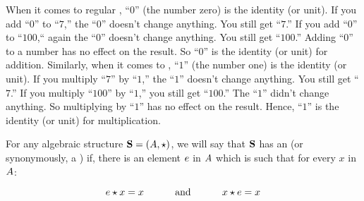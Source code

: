 \documentclass[../../../main.tex]{subfiles}
\begin{document}
\begin{aside}
  \begin{remark}
    When it comes to regular , ``$0$'' (the number zero) is the identity (or unit). If you add ``$0$'' to ``$7$,'' the ``$0$'' doesn't change anything. You still get ``$7$.'' If you add ``$0$'' to ``$100$,`` again the ``$0$'' doesn't change anything. You still get ``$100$.'' Adding ``$0$'' to a number has no effect on the result. So ``$0$'' is the identity (or unit) for addition.
    \vskip 0.5cm
    Similarly, when it comes to , ``$1$'' (the number one) is the identity (or unit). If you multiply ``$7$'' by ``$1$,'' the ``$1$'' doesn't change anything. You still get ``$7$.'' If you multiply ``$100$'' by ``$1$,'' you still get ``$100$.'' The ``$1$'' didn't change anything. So multiplying by ``$1$'' has no effect on the result. Hence, ``$1$'' is the identity (or unit) for multiplication.
  \end{remark}
\end{aside}

\begin{fdefinition}
  \label{def:algebra-with-identity}
  For any algebraic structure $\algebra{S} = (\set{A}, \opSymbol/)$, we will say that $\mathbf{S}$ has an  (or synonymously, a ) if, there is an element $\unitEl/$ in $A$ which is such that for every $x$ in $A$:
  
  \begin{equation*}
    \op{\unitEl/}{x} = x \hskip 1cm \text{ and } \hskip 1cm \op{x}{\unitEl/} = x
  \end{equation*}
\end{fdefinition}
\end{document}
